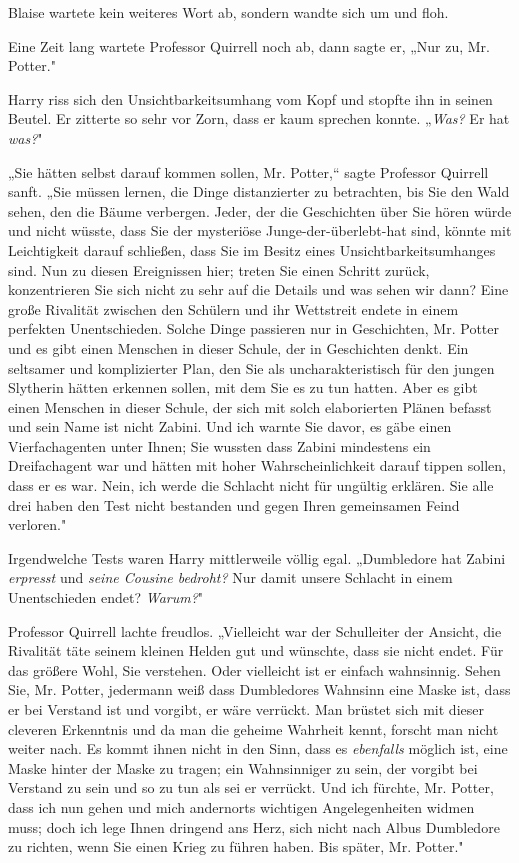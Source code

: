 {Blaise wartete kein weiteres Wort ab, sondern wandte sich um und floh.

Eine Zeit lang wartete Professor Quirrell noch ab, dann sagte er, „Nur zu, Mr. Potter."

Harry riss sich den Unsichtbarkeitsumhang vom Kopf und stopfte ihn in seinen Beutel. Er zitterte so sehr vor Zorn, dass er kaum sprechen konnte. „\emph{Was?} Er hat \emph{was?}"

„Sie hätten selbst darauf kommen sollen, Mr. Potter,“ sagte Professor Quirrell sanft. „Sie müssen lernen, die Dinge distanzierter zu betrachten, bis Sie den Wald sehen, den die Bäume verbergen. Jeder, der die Geschichten über Sie hören würde und nicht wüsste, dass Sie der mysteriöse Junge-der-überlebt-hat sind, könnte mit Leichtigkeit darauf schließen, dass Sie im Besitz eines Unsichtbarkeitsumhanges sind. Nun zu diesen Ereignissen hier; treten Sie einen Schritt zurück, konzentrieren Sie sich nicht zu sehr auf die Details und was sehen wir dann? Eine große Rivalität zwischen den Schülern und ihr Wettstreit endete in einem perfekten Unentschieden. Solche Dinge passieren nur in Geschichten, Mr. Potter und es gibt einen Menschen in dieser Schule, der in Geschichten denkt. Ein seltsamer und komplizierter Plan, den Sie als uncharakteristisch für den jungen Slytherin hätten erkennen sollen, mit dem Sie es zu tun hatten. Aber es gibt einen Menschen in dieser Schule, der sich mit solch elaborierten Plänen befasst und sein Name ist nicht Zabini. Und ich warnte Sie davor, es gäbe einen Vierfachagenten unter Ihnen; Sie wussten dass Zabini mindestens ein Dreifachagent war und hätten mit hoher Wahrscheinlichkeit darauf tippen sollen, dass er es war. Nein, ich werde die Schlacht nicht für ungültig erklären. Sie alle drei haben den Test nicht bestanden und gegen Ihren gemeinsamen Feind verloren."

Irgendwelche Tests waren Harry mittlerweile völlig egal. „Dumbledore hat Zabini \emph{erpresst} und \emph{seine Cousine bedroht?} Nur damit unsere Schlacht in einem Unentschieden endet? \emph{Warum?}"

Professor Quirrell lachte freudlos. „Vielleicht war der Schulleiter der Ansicht, die Rivalität täte seinem kleinen Helden gut und wünschte, dass sie nicht endet. Für das größere Wohl, Sie verstehen. Oder vielleicht ist er einfach wahnsinnig. Sehen Sie, Mr. Potter, jedermann weiß dass Dumbledores Wahnsinn eine Maske ist, dass er bei Verstand ist und vorgibt, er wäre verrückt. Man brüstet sich mit dieser cleveren Erkenntnis und da man die geheime Wahrheit kennt, forscht man nicht weiter nach. Es kommt ihnen nicht in den Sinn, dass es \emph{ebenfalls} möglich ist, eine Maske hinter der Maske zu tragen; ein Wahnsinniger zu sein, der vorgibt bei Verstand zu sein und so zu tun als sei er verrückt. Und ich fürchte, Mr. Potter, dass ich nun gehen und mich andernorts wichtigen Angelegenheiten widmen muss; doch ich lege Ihnen dringend ans Herz, sich nicht nach Albus Dumbledore zu richten, wenn Sie einen Krieg zu führen haben. Bis später, Mr. Potter."

}
